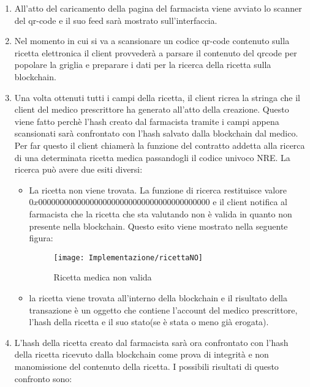 \begin{enumerate}
	\item All'atto del caricamento della pagina del farmacista viene avviato lo scanner del qr-code e il suo feed sarà mostrato sull'interfaccia.
	\item Nel momento in cui si va a scansionare un codice qr-code contenuto sulla ricetta elettronica il client provvederà a parsare il contenuto del qrcode per popolare la griglia e preparare i dati per la ricerca della ricetta sulla blockchain.
	\item Una volta ottenuti tutti i campi della ricetta, il client ricrea la stringa che il client del medico prescrittore ha generato all'atto della creazione. Questo viene fatto perchè l'hash creato dal farmacista tramite i campi appena scansionati sarà confrontato con l'hash salvato dalla blockchain dal medico. Per far questo il client chiamerà la funzione del contratto addetta alla ricerca di una determinata ricetta medica passandogli il codice univoco NRE. La ricerca può avere due esiti diversi:
	      \begin{itemize}
	      	\item La ricetta non viene trovata. La funzione di ricerca restituisce valore $0x0000000000000000000000000000000000000000$ e il client notifica al farmacista che la ricetta che sta valutando non è valida in quanto non presente nella blockchain. Questo esito viene mostrato nella seguente figura:
	      	      \begin{figure}[H]
	      	      	\centering
	      	      	\texttt{[image: Implementazione/ricettaNO]}
	      	      	\caption{Ricetta medica non valida}
	      	      	\label{fig:ricetta medica non valida}
	      	      \end{figure}
	      	\item la ricetta viene trovata all'interno della blockchain e il risultato della transazione è un oggetto che contiene l'account del medico prescrittore, l'hash della ricetta e il suo stato(se è stata o meno già erogata). 	      
	      \end{itemize}
	\item L'hash della ricetta creato dal farmacista sarà ora confrontato con l'hash della ricetta ricevuto dalla blockchain come prova di integrità e non manomissione del contenuto della ricetta. I possibili risultati di questo confronto sono:
	      \begin{itemize}

\end{itemize}
\end{enumerate}
